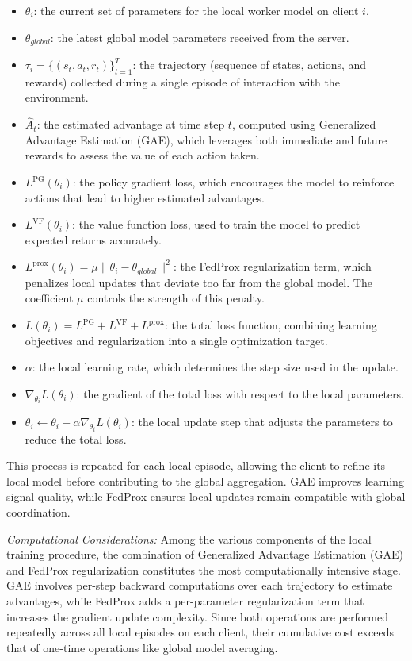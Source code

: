 \documentclass[12pt,a4paper,twoside,openany]{book}
\begin{document}
\begin{itemize}
  \item $\theta_i$: the current set of parameters for the local worker model on client $i$.
  \item $\theta_{global}$: the latest global model parameters received from the server.
  \item $\tau_i = \{(s_t, a_t, r_t)\}_{t=1}^{T}$: the trajectory (sequence of states, actions, and rewards) collected during a single episode of interaction with the environment.
  \item $\hat{A}_t$: the estimated advantage at time step $t$, computed using Generalized Advantage Estimation (GAE), which leverages both immediate and future rewards to assess the value of each action taken.
  \item $L^{\text{PG}}(\theta_i)$: the policy gradient loss, which encourages the model to reinforce actions that lead to higher estimated advantages.
  \item $L^{\text{VF}}(\theta_i)$: the value function loss, used to train the model to predict expected returns accurately.
  \item $L^{\text{prox}}(\theta_i) = \mu \|\theta_i - \theta_{global}\|^2$: the FedProx regularization term, which penalizes local updates that deviate too far from the global model. The coefficient $\mu$ controls the strength of this penalty.
  \item $L(\theta_i) = L^{\text{PG}} + L^{\text{VF}} + L^{\text{prox}}$: the total loss function, combining learning objectives and regularization into a single optimization target.
  \item $\alpha$: the local learning rate, which determines the step size used in the update.
  \item $\nabla_{\theta_i} L(\theta_i)$: the gradient of the total loss with respect to the local parameters.
  \item $\theta_i \gets \theta_i - \alpha \nabla_{\theta_i} L(\theta_i)$: the local update step that adjusts the parameters to reduce the total loss.
\end{itemize}

This process is repeated for each local episode, allowing the client to refine its local model before contributing to the global aggregation. GAE improves learning signal quality, while FedProx ensures local updates remain compatible with global coordination.

\noindent\textit{Computational Considerations:}
Among the various components of the local training procedure, the combination of Generalized Advantage Estimation (GAE) and FedProx regularization constitutes the most computationally intensive stage. GAE involves per-step backward computations over each trajectory to estimate advantages, while FedProx adds a per-parameter regularization term that increases the gradient update complexity. Since both operations are performed repeatedly across all local episodes on each client, their cumulative cost exceeds that of one-time operations like global model averaging.
\end{document}
